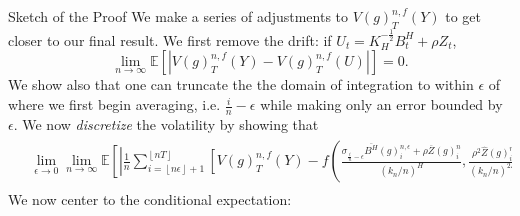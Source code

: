\documentclass[final,hyperref={pdfpagelabels=false}]{beamer}
\newcommand{\E}{\mathbb{E}}
\begin{document}
\begin{frame}{}
\begin{columns}[t]
\begin{column}{0.4\linewidth}
        \begin{block}{Sketch of the Proof}
          We make a series of adjustments to \(V(g)^{n,f}_T(Y)\) to get closer to our final result. We first remove the drift: if \(U_t = K_H^{-\frac{1}{2}}B^H_t + \rho Z_t\),
          \begin{equation*}
            \lim_{n \rightarrow \infty} \E\left[ \left| V(g)^{n,f}_T(Y) - V(g)^{n,f}_T(U) \right| \right] = 0.
          \end{equation*}
          We show also that one can truncate the the domain of integration to within \(\epsilon\) of where we first begin averaging, i.e. \(\frac{i}{n} - \epsilon\) while making only an error bounded by \(\epsilon\).
          We now \textit{discretize} the volatility by showing that
          \begin{align*}
            \phantom{}
            \begin{aligned}
      &\lim_{\epsilon \rightarrow 0}\lim_{n \rightarrow \infty}\E \left[ \left| \frac{1}{n}\sum_{i=\left\lfloor n\epsilon \right\rfloor + 1}^{\left\lfloor nT \right\rfloor} \left[ V(g)^{n,f}_T(Y) \right. \right. \right. - \left. \left. \left. f\left( \frac{\sigma_{\frac{i}{n}-\epsilon}\overline{B^H}(g)^{n,\epsilon}_i + \rho\overline{Z}(g)^n_i}{(k_n/n)^{H}}, \frac{\rho^2\widehat{Z}(g)^n_i}{(k_n/n)^{2H}}\right) \right] \right| \right] = 0
            \end{aligned}
          \end{align*}
          We now center to the conditional expectation:

\end{block}
\end{column}
\end{columns}
\end{frame}
\end{document}
